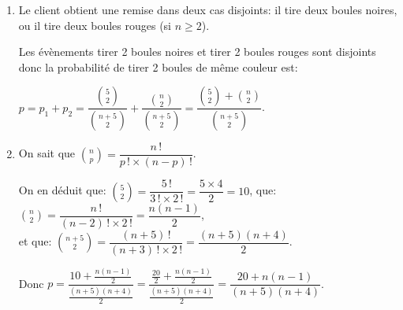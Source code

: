 \documentclass[10pt]{article}
\providecommand{\ds}{\displaystyle}
\begin{document}
\begin{enumerate}
\item 


Le client obtient une remise dans deux cas disjoints: il tire deux boules noires, ou il tire deux boules rouges (si $n\geqslant 2$).


Les évènements \og tirer 2 boules noires \fg{} et \og tirer 2 boules rouges\fg{}  sont disjoints donc la probabilité de tirer 2 boules de même couleur est:

$p=p_1+p_2= \dfrac{\binom{5}{2}}{\binom{n+5}{2}} + \dfrac{\binom{n}{2}}{\binom{n+5}{2}} = \dfrac{\binom{5}{2} +\binom{n}{2}}{\binom{n+5}{2}}$.

\item 


On sait que $\ds\binom{n}{p} = \dfrac{n\,!}{p\,! \times (n-p)\,!}$.

On en déduit que:
$\ds\binom{5}{2}=\dfrac{5\,!}{3\,! \times 2\,!}= \dfrac{5\times 4}{2}=10$,
que: $\ds\binom{n}{2}=\dfrac{n\,!}{\left (n-2\right )\,! \times 2\,!}= \dfrac{n\left (n-1\right )}{2}$,\\
et que: $\ds\binom{n+5}{2}=\dfrac{(n+5)\,!}{\left (n+3\right )\,! \times 2\,!}= \dfrac{\left (n+5\right )\left (n+4\right )}{2}$.

Donc
$p= \dfrac{10 + \frac{n\left (n-1\right )}{2}}{\frac{\left (n+5\right )\left (n+4\right )}{2}}
= \dfrac{\frac{20}{2} + \frac{n\left (n-1\right )}{2}}{\frac{\left (n+5\right )\left (n+4\right )}{2}}
=\dfrac{20+n\left (n-1\right )}{\left (n+5\right )\left (n+4\right )}$.


\end{enumerate}
\end{document}
